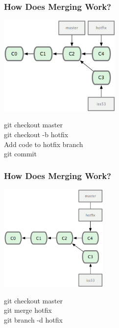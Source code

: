 \begin{frame}
\frametitle{\large How Does Merging Work?}
\begin{center}
\includegraphics[width=0.45\textwidth]{img/branching_images/f4.png}
\end{center}
\begin{center}
\small git checkout master \\
\small git checkout -b hotfix \\
\small Add code to hotfix branch \\
\small git commit
\end{center}
\end{frame}

\begin{frame}
\frametitle{\large How Does Merging Work?}
\begin{center}
\includegraphics[width=0.4\textwidth]{img/branching_images/f5.png}
\end{center}
\vspace{2mm}
\begin{center}
\small git checkout master \\
\small git merge hotfix \\
\small git branch -d hotfix
\end{center}
\end{frame}

